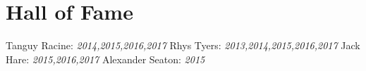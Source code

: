 \section{Hall of Fame} 
Tanguy Racine: \textsl{2014,2015,2016,2017}
Rhys Tyers: \textsl{2013,2014,2015,2016,2017}
Jack Hare: \textsl{2015,2016,2017}
Alexander Seaton: \textsl{2015}
